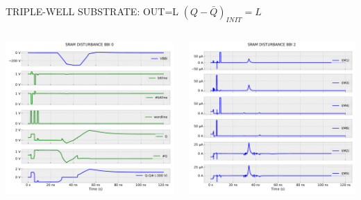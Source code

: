 
\begin{frame}{TRIPLE-WELL SUBSTRATE: OUT=L}
	\vspace{5mm}
	$(Q-\bar{Q})_{INIT}=L$
	\vspace{5mm}
	\begin{columns}
		\begin{column}{0.5\textwidth}
			\centering
			\includegraphics[width=\textwidth]{./figures/SRAMBBI0_zLOW_TW-300.pdf}
		\end{column}
		\begin{column}{0.5\textwidth}
			\centering
			\includegraphics[width=\textwidth]{./figures/SRAMBBI2_zLOW_TW-300.pdf}
		\end{column}
	\end{columns}
\end{frame}
